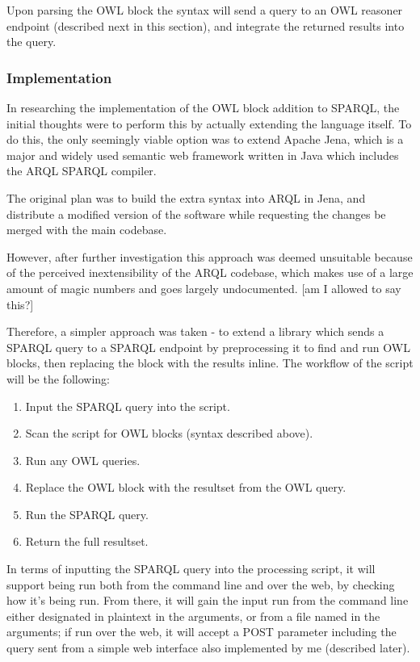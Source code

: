 \documentclass{article}
\begin{document}
Upon parsing the OWL block the syntax will send a query to an OWL reasoner
endpoint (described next in this section), and integrate the returned results
into the query. 

\subsubsection{Implementation}

In researching the implementation of the OWL block addition to SPARQL, the
initial thoughts were to perform this by actually extending the language itself.
To do this, the only seemingly viable option was to extend Apache Jena, which is
a major and widely used semantic web framework written in Java which includes the 
ARQL SPARQL compiler. 

The original plan was to build the extra syntax into ARQL in Jena, and
distribute a modified version of the software while requesting the changes be
merged with the main codebase.

However, after further investigation this approach was deemed unsuitable because
of the perceived inextensibility of the ARQL codebase, which makes use of a
large amount of magic numbers and goes largely undocumented. [am I allowed to
say this?]

Therefore, a simpler approach was taken - to extend a library which sends a
SPARQL query to a SPARQL endpoint by preprocessing it to find and run OWL
blocks, then replacing the block with the results inline. The workflow of the
script will be the following:

\begin{enumerate}
    \item Input the SPARQL query into the script.
    \item Scan the script for OWL blocks (syntax described above).
    \item Run any OWL queries.
    \item Replace the OWL block with the resultset from the OWL query.
    \item Run the SPARQL query.
    \item Return the full resultset.
\end{enumerate}

In terms of inputting the SPARQL query into the processing script, it will
support being run both from the command line and over the web, by checking how
it's being run. From there, it will gain the input run from the command line
either designated in plaintext in the arguments, or from a file named in the
arguments; if run over the web, it will accept a POST parameter including the
query sent from a simple web interface also implemented by me (described later).
\end{document}
